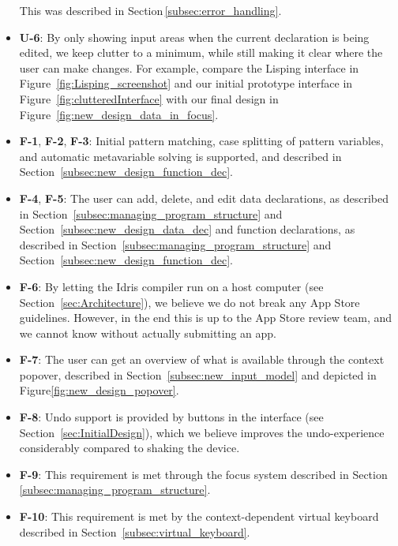 \begin{itemize}
This was described in Section\,\ref{subsec:error_handling}.
\item \textbf{U-6}: By only showing input areas when the current declaration is being edited, we keep clutter to a minimum, while still making it clear where the user can make changes. For example, compare the Lisping interface in Figure~\ref{fig:Lisping_screenshot} and our initial prototype interface in  Figure~\ref{fig:clutteredInterface} with our final design in Figure~\ref{fig:new_design_data_in_focus}.
\item \textbf{F-1}, \textbf{F-2}, \textbf{F-3}: Initial pattern matching, case splitting of pattern variables, and automatic metavariable solving is supported, and described in Section~\ref{subsec:new_design_function_dec}.
\item \textbf{F-4}, \textbf{F-5}: The user can add, delete, and edit data declarations, as described in Section~\ref{subsec:managing_program_structure} and Section~\ref{subsec:new_design_data_dec}
and function declarations, as described in Section~\ref{subsec:managing_program_structure} and Section~\ref{subsec:new_design_function_dec}.
\item \textbf{F-6}: By letting the Idris compiler run on a host computer (see Section~\ref{sec:Architecture}), we believe we do not break any App Store guidelines. However, in the end this is up to the App Store review team, and we cannot know without actually submitting an app.
\item \textbf{F-7}: The user can get an overview of what is available through the context popover, described in Section~\ref{subsec:new_input_model}
and depicted in Figure\ref{fig:new_design_popover}.
\item \textbf{F-8}: Undo support is provided by buttons in the interface (see Section~\ref{sec:InitialDesign}), which we believe improves the undo-experience considerably
compared to shaking the device.
\item \textbf{F-9}: This requirement is met through the focus system described in Section
\ref{subsec:managing_program_structure}.
\item \textbf{F-10}: This requirement is met by the context-dependent virtual keyboard described in Section~\ref{subsec:virtual_keyboard}.

\end{itemize}

